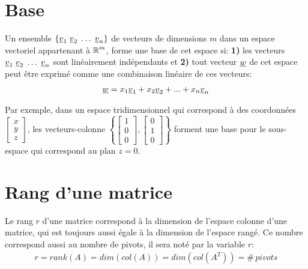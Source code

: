 \section{Base}
\label{sec:base}

Un ensemble $\{ \underline{v}_1 \; \underline{v}_2 \; \hdots \; \underline{v}_n \}$ de vecteurs de dimensions $m$ dans un espace vectoriel appartenant à $\operatorname{\mathbb{R}}^m$, forme une base de cet espace si: \textbf{1)} les vecteurs $\underline{v}_1 \; \underline{v}_2 \; \hdots \; \underline{v}_n$ sont linéairement indépendants et \textbf{2)} tout vecteur $\underline{w}$ de cet espace peut être exprimé comme une combinaison linéaire de ces vecteurs:
\begin{align}
	\underline{w} = x_1 \underline{v}_1 + x_2 \underline{v}_2 + ... + x_n \underline{v}_n
\end{align}

Par exemple, dans un espace tridimensionnel qui correspond à des coordonnées $
\left[
\begin{array}{c}
	x \\ y \\ z
\end{array}
\right]
$, les vecteurs-colonne $\left\{
\left[
\begin{array}{c}
	1 \\ 0 \\ 0
\end{array}
\right],
\left[
\begin{array}{c}
	0 \\ 1 \\ 0
\end{array}
\right]
\right\}$
forment une base pour le sous-espace qui correspond au plan $z=0$.

\section{Rang d'une matrice}
\label{sec:rang}

Le rang $r$ d'une matrice correspond à la dimension de l'espace colonne d'une matrice, qui est toujours aussi égale à la dimension de l'espace rangé. Ce nombre correspond aussi au nombre de pivots, il sera noté par la variable $r$:
\begin{align}
	r = rank( A ) = dim( col(A) ) = dim( col(A^T) ) =\#\, pivots
\end{align}


